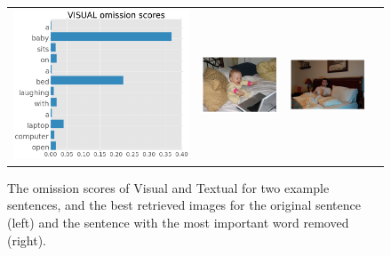 \begin{figure}[t]
\begin{tabular}{cccc}
    \includegraphics[scale=0.16]{new_omission_examples/visual2} &
    \includegraphics[scale=0.28]{new_omission_examples/img2} & 
    \includegraphics[scale=0.30]{new_omission_examples/img2_omit}
    \end{tabular}
    \caption{The omission scores of {\sc Visual} and {\sc Textual} for two example sentences, 
and the best retrieved images for the original sentence (left) and the sentence with the most 
important word removed (right). 
}
    \label{fig:omissionex}
\end{figure}

